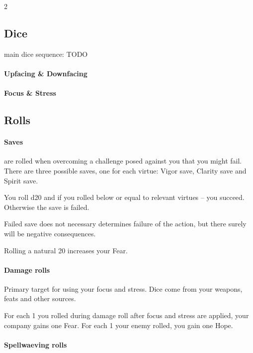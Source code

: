 
\begin{multicols*}{2}

\subsection*{Dice}

main dice sequence: TODO

\paragraph{Upfacing \& Downfacing}

\paragraph{Focus \& Stress}

\subsection*{Rolls}

\paragraph{Saves} are rolled when overcoming a challenge posed against you that you might fail. 
There are three possible saves, one for each virtue: Vigor save, Clarity save and Spirit save.

You roll d20 and if you rolled below or equal to relevant virtues -- you succeed. Otherwise the save is failed.

Failed save does not necessary determines failure of the action, but there surely will be negative consequences.

Rolling a natural 20 increases your Fear.

\paragraph{Damage rolls}

Primary target for using your focus and stress. Dice come from your weapons, feats and other sources.

For each 1 you rolled during damage roll after focus and stress are applied, your company gains one Fear.
For each 1 your enemy rolled, you gain one Hope.

\paragraph{Spellwaeving rolls}


\end{multicols*}
